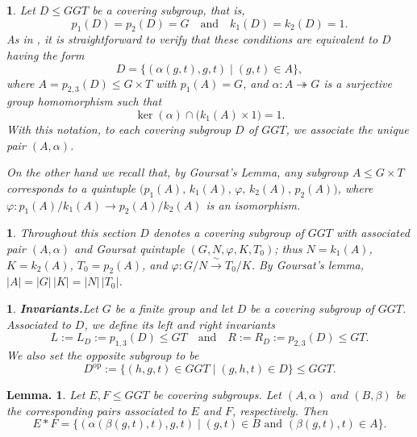 \documentclass[12pt]{article}
\theoremstyle{change}
\newtheorem{lem}[theorem]{Lemma.}
\newtheorem{nothing}[theorem]{}
\renewcommand{\le}{\leqslant} %
\newcommand{\1}{{\bf 1}}
\begin{document}
\begin{nothing}\label{covering}
Let $D \leq GGT$ be a {covering subgroup}, that is,
\begin{equation*}
p_1(D) = p_2(D) = G \quad \text{and} \quad k_1(D) = k_2(D) = 1.
\end{equation*}
As in \cite[Section 3]{R1}, it is straightforward to verify that these conditions are equivalent to $D$ having the form
\begin{equation*}
D = \{ (\alpha(g,t), g, t) \mid (g,t) \in A \},
\end{equation*}
where $A = p_{2,3}(D) \leq G \times T$ with $p_1(A) = G$, and
$\alpha : A \twoheadrightarrow G$
is a surjective group homomorphism such that
\[
\ker(\alpha) \cap \bigl(k_1(A) \times 1\bigr) = 1.
\]
With this notation, to each covering subgroup $D$ of $GGT$, we associate the unique pair $(A,\alpha)$.

On the other hand we recall that, by Goursat's Lemma, any subgroup $A \leq G \times T$ corresponds to a quintuple $\bigl(p_1(A),\, k_1(A),\, \varphi,\, k_2(A),\, p_2(A)\bigr)$,
where $\varphi : p_1(A)/k_1(A) \to p_2(A)/k_2(A)$ is an isomorphism.  
\end{nothing}

\begin{nothing}\label{section3 conventions}
Throughout this section $D$ denotes a covering subgroup of $GGT$ with associated pair $(A,\alpha)$
and Goursat quintuple $(G,N,\varphi,K,T_0)$; thus $N=k_1(A)$, $K=k_2(A)$, $T_0=p_2(A)$, and
$\varphi\colon G/N \xrightarrow{\ \sim\ } T_0/K$. By Goursat's lemma, $|A| = |G|\,|K| = |N|\,|T_0|$.
\end{nothing}
\begin{nothing}\textbf{Invariants.}\label{sec: invariants}
Let \(G\) be a finite group and let $D$ be a covering subgroup of $GGT$. Associated to \(D\), we define its \emph{left} and \emph{right} invariants
\[
L := L_D := p_{1,3}(D) \leq GT \quad \text{and} \quad R := R_D := p_{2,3}(D) \leq GT.
\]
We also set the opposite subgroup to be 
\[
D^{\mathrm{op}} := \{(h,g,t) \in GGT \mid (g,h,t) \in D\}\le GGT.
\]
\end{nothing}
\begin{lem}\label{lem: productofcovering}
Let \(E,F\leq GGT\) be covering subgroups. Let \((A,\alpha)\) and \((B,\beta)\) be the corresponding pairs associated to \(E\) and \(F\), respectively. Then
\begin{equation*}
E*F
=
\{(\alpha(\beta(g,t),t),g,t)\mid (g,t)\in B \text{ and } (\beta(g,t),t)\in A\}.
\end{equation*}
\end{lem}
\end{document}
